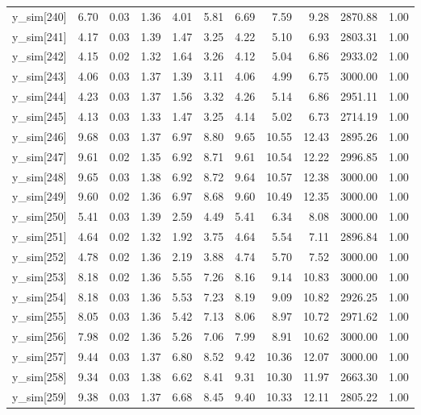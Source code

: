\begin{table}[ht]
\begin{tabular}{rrrrrrrrrrr}
  y\_sim[240] & 6.70 & 0.03 & 1.36 & 4.01 & 5.81 & 6.69 & 7.59 & 9.28 & 2870.88 & 1.00 \\ 
  y\_sim[241] & 4.17 & 0.03 & 1.39 & 1.47 & 3.25 & 4.22 & 5.10 & 6.93 & 2803.31 & 1.00 \\ 
  y\_sim[242] & 4.15 & 0.02 & 1.32 & 1.64 & 3.26 & 4.12 & 5.04 & 6.86 & 2933.02 & 1.00 \\ 
  y\_sim[243] & 4.06 & 0.03 & 1.37 & 1.39 & 3.11 & 4.06 & 4.99 & 6.75 & 3000.00 & 1.00 \\ 
  y\_sim[244] & 4.23 & 0.03 & 1.37 & 1.56 & 3.32 & 4.26 & 5.14 & 6.86 & 2951.11 & 1.00 \\ 
  y\_sim[245] & 4.13 & 0.03 & 1.33 & 1.47 & 3.25 & 4.14 & 5.02 & 6.73 & 2714.19 & 1.00 \\ 
  y\_sim[246] & 9.68 & 0.03 & 1.37 & 6.97 & 8.80 & 9.65 & 10.55 & 12.43 & 2895.26 & 1.00 \\ 
  y\_sim[247] & 9.61 & 0.02 & 1.35 & 6.92 & 8.71 & 9.61 & 10.54 & 12.22 & 2996.85 & 1.00 \\ 
  y\_sim[248] & 9.65 & 0.03 & 1.38 & 6.92 & 8.72 & 9.64 & 10.57 & 12.38 & 3000.00 & 1.00 \\ 
  y\_sim[249] & 9.60 & 0.02 & 1.36 & 6.97 & 8.68 & 9.60 & 10.49 & 12.35 & 3000.00 & 1.00 \\ 
  y\_sim[250] & 5.41 & 0.03 & 1.39 & 2.59 & 4.49 & 5.41 & 6.34 & 8.08 & 3000.00 & 1.00 \\ 
  y\_sim[251] & 4.64 & 0.02 & 1.32 & 1.92 & 3.75 & 4.64 & 5.54 & 7.11 & 2896.84 & 1.00 \\ 
  y\_sim[252] & 4.78 & 0.02 & 1.36 & 2.19 & 3.88 & 4.74 & 5.70 & 7.52 & 3000.00 & 1.00 \\ 
  y\_sim[253] & 8.18 & 0.02 & 1.36 & 5.55 & 7.26 & 8.16 & 9.14 & 10.83 & 3000.00 & 1.00 \\ 
  y\_sim[254] & 8.18 & 0.03 & 1.36 & 5.53 & 7.23 & 8.19 & 9.09 & 10.82 & 2926.25 & 1.00 \\ 
  y\_sim[255] & 8.05 & 0.03 & 1.36 & 5.42 & 7.13 & 8.06 & 8.97 & 10.72 & 2971.62 & 1.00 \\ 
  y\_sim[256] & 7.98 & 0.02 & 1.36 & 5.26 & 7.06 & 7.99 & 8.91 & 10.62 & 3000.00 & 1.00 \\ 
  y\_sim[257] & 9.44 & 0.03 & 1.37 & 6.80 & 8.52 & 9.42 & 10.36 & 12.07 & 3000.00 & 1.00 \\ 
  y\_sim[258] & 9.34 & 0.03 & 1.38 & 6.62 & 8.41 & 9.31 & 10.30 & 11.97 & 2663.30 & 1.00 \\ 
  y\_sim[259] & 9.38 & 0.03 & 1.37 & 6.68 & 8.45 & 9.40 & 10.33 & 12.11 & 2805.22 & 1.00 \\ 

\end{tabular}
\end{table}
